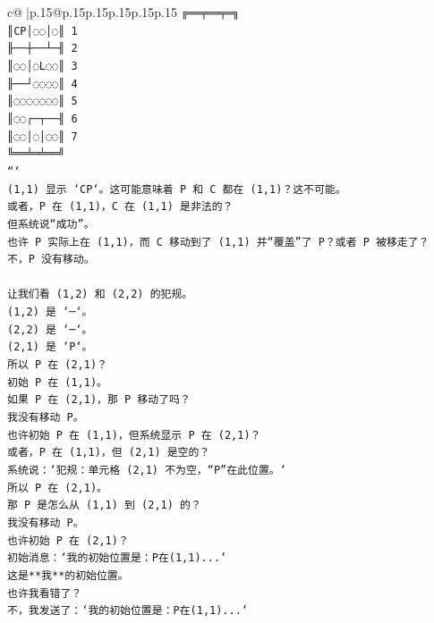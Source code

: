 \documentclass{article}
\begin{document}
{\begin{supertabular}{c@{$\;$}|p{.15\linewidth}@{}p{.15\linewidth}p{.15\linewidth}p{.15\linewidth}p{.15\linewidth}p{.15\linewidth}}
{{{\texttt{╔══╤══╤═╗} \\
\texttt{║CP│◌◌│◌║ 1} \\
\texttt{╟──┼──┴─╢ 2} \\
\texttt{║◌◌│◌L◌◌║ 3} \\
\texttt{╟──┘◌◌◌◌║ 4} \\
\texttt{║◌◌◌◌◌◌◌║ 5} \\
\texttt{║◌◌┌─┬──╢ 6} \\
\texttt{║◌◌│◌│◌◌║ 7} \\
\texttt{╚══╧═╧══╝} \\
\texttt{```} \\
\texttt{(1,1) 显示 `CP`。这可能意味着 P 和 C 都在 (1,1)？这不可能。} \\
\texttt{或者，P 在 (1,1)，C 在 (1,1) 是非法的？} \\
\texttt{但系统说“成功”。} \\
\texttt{也许 P 实际上在 (1,1)，而 C 移动到了 (1,1) 并“覆盖”了 P？或者 P 被移走了？} \\
\texttt{不，P 没有移动。} \\
\\ 
\texttt{让我们看 (1,2) 和 (2,2) 的犯规。} \\
\texttt{(1,2) 是 `─`。} \\
\texttt{(2,2) 是 `─`。} \\
\texttt{(2,1) 是 `P`。} \\
\texttt{所以 P 在 (2,1)？} \\
\texttt{初始 P 在 (1,1)。} \\
\texttt{如果 P 在 (2,1)，那 P 移动了吗？} \\
\texttt{我没有移动 P。} \\
\texttt{也许初始 P 在 (1,1)，但系统显示 P 在 (2,1)？} \\
\texttt{或者，P 在 (1,1)，但 (2,1) 是空的？} \\
\texttt{系统说：`犯规：单元格 (2,1) 不为空，“P”在此位置。`} \\
\texttt{所以 P 在 (2,1)。} \\
\texttt{那 P 是怎么从 (1,1) 到 (2,1) 的？} \\
\texttt{我没有移动 P。} \\
\texttt{也许初始 P 在 (2,1)？} \\
\texttt{初始消息：`我的初始位置是：P在(1,1)...`} \\
\texttt{这是**我**的初始位置。} \\
\texttt{也许我看错了？} \\
\texttt{不，我发送了：`我的初始位置是：P在(1,1)...`} \\
}}}
\end{supertabular}}
\end{document}
